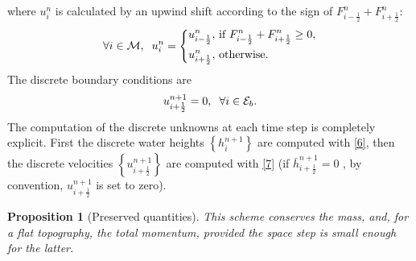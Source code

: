 \documentclass[11pt,a4paper,center,notitlepage]{article}
\numberwithin{equation}{section}
\newtheorem{prop}{Proposition}
\begin{document}
where $u_i^n$ is calculated by an upwind shift according to the sign of ${F_{i - \frac{1}{2}}^n + F_{i + \frac{1}{2}}^n}$:
\begin{equation*}
\forall i \in \mathcal{M}, \hspace{2mm} u_i^n = \left\{ \begin{split}
u_{i - \frac{1}{2}}^n, & \mbox{ if } F_{i - \frac{1}{2}}^n + F_{i + \frac{1}{2}}^n \ge 0,\\
u_{i + \frac{1}{2}}^n, & \mbox{ otherwise}.
\end{split} \right.
\end{equation*}
The discrete boundary conditions are 
\begin{align}
\label{8}
u_{i + \frac{1}{2}}^{n + 1} = 0, \hspace{2mm}\forall i \in {\mathcal{E}_b}. 
\end{align}
The computation of the discrete unknowns at each time step is completely explicit. First the discrete water heights $\left\{ {h_i^{n + 1}} \right\}$ are computed with \eqref{6}, then the discrete velocities $\left\{ {u_{i + \frac{1}{2}}^{n + 1}} \right\}$ are computed with \eqref{7} (if $\bar h_{i + \frac{1}{2}}^{n + 1} = 0$ , by convention, $u_{i + \frac{1}{2}}^{n + 1}$ is set to zero). 

\begin{prop}[Preserved quantities]
This scheme conserves the mass, and, for a flat topography, the total momentum, provided the space step is small enough for the latter. 
\end{prop}
\end{document}
